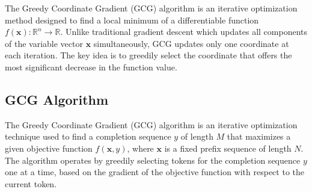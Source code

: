 \documentclass[../thesis.tex]{subfiles}
\begin{document}

The Greedy Coordinate Gradient (GCG) algorithm is an iterative optimization method designed to find a local minimum of a differentiable function $f(\mathbf{x}): \mathbb{R}^n \rightarrow \mathbb{R}$. Unlike traditional gradient descent which updates all components of the variable vector $\mathbf{x}$ simultaneously, GCG updates only one coordinate at each iteration. The key idea is to greedily select the coordinate that offers the most significant decrease in the function value.

\subsection{GCG Algorithm}
The Greedy Coordinate Gradient (GCG) algorithm is an iterative optimization technique used to find a completion sequence $y$ of length $M$ that maximizes a given objective function $f(\mathbf{x}, y)$, where $\mathbf{x}$ is a fixed prefix sequence of length $N$. The algorithm operates by greedily selecting tokens for the completion sequence $y$ one at a time, based on the gradient of the objective function with respect to the current token.
\end{document}
